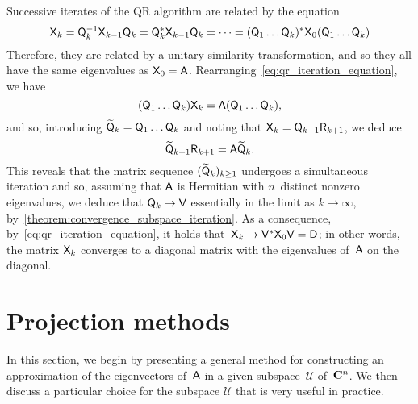 Successive iterates of the QR algorithm are related by the equation
\begin{equation}
    \label{eq:qr_iteration_equation}
    \mathsf X_{k} = \mathsf Q_k^{-1}  \mathsf X_{k-1} \mathsf Q_k
    = \mathsf Q_k^* \mathsf X_{k-1} \mathsf Q_k
    = \dots = (\mathsf Q_1 \dots \mathsf Q_k)^* \mathsf X_{0} (\mathsf Q_1 \dots \mathsf Q_k)
\end{equation}
Therefore, they are related by a unitary similarity transformation,
and so they all have the same eigenvalues as $\mathsf X_0 = \mathsf A$.
Rearranging~\eqref{eq:qr_iteration_equation},
we have
\[
    (\mathsf Q_1 \dots \mathsf Q_k) \mathsf X_{k} = \mathsf A (\mathsf Q_1 \dots \mathsf Q_k),
\]
and so, introducing $\widetilde {\mathsf Q}_k = \mathsf Q_1 \dots \mathsf Q_k$
and noting that $\mathsf X_k = \mathsf Q_{k+1} \mathsf R_{k+1}$,
we deduce
\[
    \widetilde {\mathsf Q}_{k+1} \mathsf R_{k+1} = \mathsf A \widetilde {\mathsf Q}_k.
\]
This reveals that
the matrix sequence $(\widetilde{\mathsf Q}_{k})_{k\geq 1}$ undergoes a simultaneous iteration and so,
assuming that $\mathsf A$ is Hermitian with $n$~distinct nonzero eigenvalues,
we deduce that $\mathsf Q_k \to \mathsf V$ essentially in the limit as $k \to \infty$,
by~\cref{theorem:convergence_subspace_iteration}.
As a consequence, by~\eqref{eq:qr_iteration_equation},
it holds that~$\mathsf X_k \to \mathsf V^* \mathsf X_0 \mathsf V = \mathsf D$;
in other words, the matrix $\mathsf X_k$ converges to a diagonal matrix with the eigenvalues of~$\mathsf A$ on the diagonal.

\section{Projection methods}
\label{sec:projection_methods}
In this section,
we begin by presenting a general method for constructing an approximation of the eigenvectors of~$\mathsf A$ in a given subspace~$\mathcal U$ of~$\mathbf C^{n}$.
We then discuss a particular choice for the subspace $\mathcal U$ that is very useful in practice.

